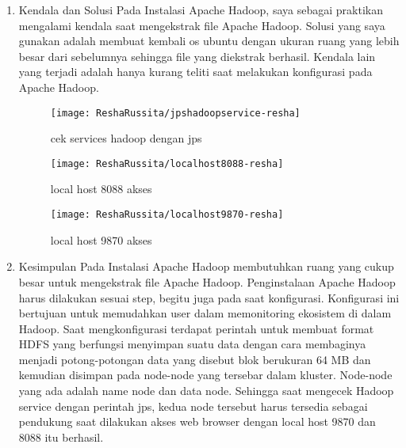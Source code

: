 
\begin{enumerate}
\item Kendala dan Solusi
\newline Pada Instalasi Apache Hadoop, saya sebagai praktikan mengalami kendala saat mengekstrak file Apache Hadoop. Solusi yang saya gunakan adalah membuat kembali os ubuntu dengan ukuran ruang yang lebih besar dari sebelumnya sehingga file yang diekstrak berhasil. 
Kendala lain yang terjadi adalah hanya kurang teliti saat melakukan konfigurasi pada Apache Hadoop.

\begin{figure}[!ht]
\texttt{[image: ReshaRussita/jpshadoopservice-resha]}
\caption{cek services hadoop dengan jps}
\label{gam:perkuliahan-22-09}
\end{figure}

\begin{figure}[!ht]
\texttt{[image: ReshaRussita/localhost8088-resha]}
\caption{local host 8088 akses}
\label{gam:perkuliahan-22-09}
\end{figure}

\begin{figure}[!ht]
\texttt{[image: ReshaRussita/localhost9870-resha]}
\caption{local host 9870 akses}
\label{gam:perkuliahan-22-09}
\end{figure}

\newpage
\item Kesimpulan
\newline Pada Instalasi Apache Hadoop membutuhkan ruang yang cukup besar untuk mengekstrak file Apache Hadoop. Penginstalaan Apache Hadoop harus dilakukan sesuai step, begitu juga pada saat konfigurasi. Konfigurasi ini bertujuan untuk memudahkan user dalam memonitoring ekosistem di dalam Hadoop. Saat mengkonfigurasi terdapat perintah untuk membuat format HDFS yang berfungsi menyimpan suatu data dengan cara membaginya menjadi potong-potongan data yang disebut blok berukuran 64 MB dan kemudian disimpan pada node-node yang tersebar dalam kluster. Node-node yang ada adalah name node dan data node. Sehingga saat mengecek Hadoop service dengan perintah jps, kedua node tersebut harus tersedia sebagai pendukung saat dilakukan akses web browser dengan local host 9870 dan 8088 itu berhasil.

\end{enumerate}

